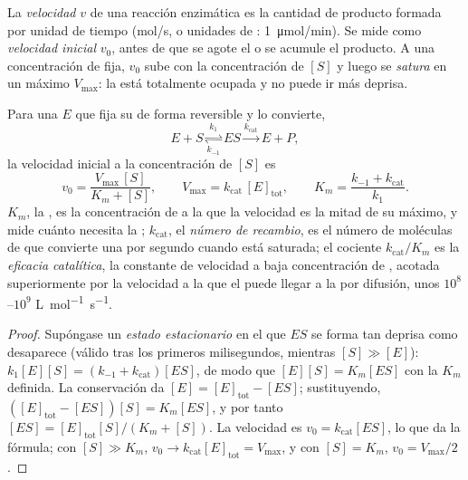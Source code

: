 \begin{definition}\label{def:b1:enzymes:rate}
La \emph{velocidad} $v$ de una reacción
enzimática es la cantidad de producto formada por unidad de tiempo
(\unit{mol/s}, o unidades de : \qty{1}{\micro mol/min}). Se mide como
\emph{velocidad inicial} $v_0$, antes de que se agote el  o se
acumule el producto. A una concentración de  fija, $v_0$ sube con la
concentración de  $[S]$ y luego se \emph{satura} en un máximo
$V_{\max}$: la  está totalmente ocupada y no puede ir más deprisa.
\end{definition}

\begin{theorem}\label{thm:b1:enzymes:mm}
Para una  $E$ que fija su  de forma reversible y lo convierte,
\[
E + S \underset{k_{-1}}{\overset{k_1}{\rightleftharpoons}} ES
\overset{k_{\text{cat}}}{\longrightarrow} E + P ,
\]
la velocidad inicial a la concentración de  $[S]$ es
\[
v_0 = \frac{V_{\max}\,[S]}{K_m + [S]}, \qquad V_{\max} = k_{\text{cat}}\,[E]_{\text{tot}},
\qquad K_m = \frac{k_{-1} + k_{\text{cat}}}{k_1} .
\]
$K_m$, la \emph{}, es la concentración de  a
la que la velocidad es la mitad de su máximo, y mide cuánto 
necesita la ; $k_{\text{cat}}$, el \emph{número de
recambio}, es el número de moléculas de 
que convierte una  por segundo cuando está saturada; el cociente
$k_{\text{cat}}/K_m$ es la \emph{eficacia catalítica}, la constante de
velocidad a baja concentración de , acotada superiormente por la
velocidad a la que el  puede llegar a la  por difusión, unos
$10^8$--$10^9$ \unit{L.mol^{-1}.s^{-1}}.
\end{theorem}
\begin{proof}
Supóngase un \emph{estado estacionario} en el que $ES$ se forma tan deprisa
como desaparece (válido tras los primeros milisegundos, mientras
$[S] \gg [E]$): $k_1[E][S] = (k_{-1} + k_{\text{cat}})[ES]$, de modo que
$[E][S] = K_m[ES]$ con la $K_m$ definida. La conservación da
$[E] = [E]_{\text{tot}} -
[ES]$; sustituyendo,
$([E]_{\text{tot}} - [ES])[S] = K_m[ES]$, y por tanto
$[ES] = [E]_{\text{tot}}[S]/(K_m + [S])$. La velocidad es
$v_0 = k_{\text{cat}}[ES]$, lo que da la fórmula; con $[S] \gg K_m$,
$v_0 \to k_{\text{cat}}[E]_{\text{tot}} = V_{\max}$, y con $[S] = K_m$,
$v_0 = V_{\max}/2$.
\end{proof}


